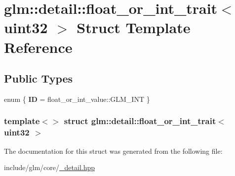 \hypertarget{structglm_1_1detail_1_1float__or__int__trait_3_01uint32_01_4}{\section{glm\-:\-:detail\-:\-:float\-\_\-or\-\_\-int\-\_\-trait$<$ uint32 $>$ \-Struct \-Template \-Reference}
\label{structglm_1_1detail_1_1float__or__int__trait_3_01uint32_01_4}
}
\subsection*{\-Public \-Types}
\begin{DoxyCompactItemize}
\item 
enum \{ {\bfseries \-I\-D} =  float\-\_\-or\-\_\-int\-\_\-value\-:\-:\-G\-L\-M\-\_\-\-I\-N\-T
 \}
\end{DoxyCompactItemize}
\subsubsection*{template$<$$>$ struct glm\-::detail\-::float\-\_\-or\-\_\-int\-\_\-trait$<$ uint32 $>$}



\-The documentation for this struct was generated from the following file\-:\begin{DoxyCompactItemize}
\item 
include/glm/core/\hyperlink{__detail_8hpp}{\-\_\-detail.\-hpp}\end{DoxyCompactItemize}
